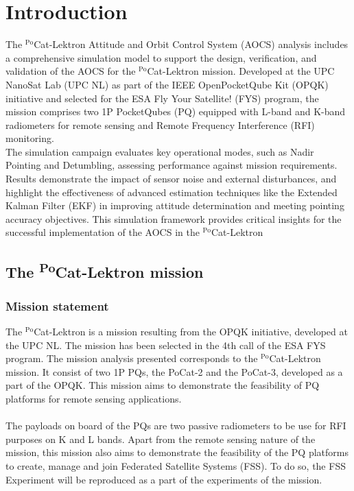 \section{Introduction}
The $^{\text{Po}}$Cat-Lektron Attitude and Orbit Control System (AOCS) analysis includes a comprehensive simulation model to support the design,
verification, and validation of the AOCS for the $^{\text{Po}}$Cat-Lektron mission. 
Developed at the UPC NanoSat Lab (UPC NL) as part of the IEEE OpenPocketQube Kit (OPQK) initiative and selected for the ESA Fly 
Your Satellite! (FYS) program, the mission comprises two 1P PocketQubes (PQ) equipped with L-band and K-band radiometers for 
remote sensing and Remote Frequency Interference (RFI) monitoring.\\

\noindent The simulation campaign evaluates key operational modes, such as Nadir Pointing and Detumbling, 
assessing performance against mission requirements. Results demonstrate the impact of sensor noise and external disturbances, 
and highlight the effectiveness of advanced estimation techniques like the Extended Kalman Filter (EKF) in improving attitude 
determination and meeting pointing accuracy objectives. This simulation framework provides critical insights for the successful 
implementation of the AOCS in the $^{\text{Po}}$Cat-Lektron

\subsection{The \texorpdfstring{\textsuperscript{Po}}CCat-Lektron mission}

\subsubsection{Mission statement}

The $^{\text{Po}}$Cat-Lektron is a mission resulting from the OPQK initiative, 
developed at the UPC NL. The mission has been selected in the 4th call of 
the ESA FYS program. The mission analysis presented corresponds 
to the $^{\text{Po}}$Cat-Lektron mission. It consist of two 1P PQs, the PoCat-2 and the 
PoCat-3, developed as a part of the OPQK. This mission aims to 
demonstrate the feasibility of PQ platforms for remote sensing applications.\cite{wiki}
\paragraph{}
The payloads on board of the PQs are two passive radiometers to be use for 
RFI purposes on K and L bands. Apart from the remote sensing nature of the mission, 
this mission also aims to demonstrate the feasibility of the PQ platforms to 
create, manage and join Federated Satellite Systems (FSS). To do so, the FSS Experiment 
will be reproduced as a part of the experiments of the mission.

